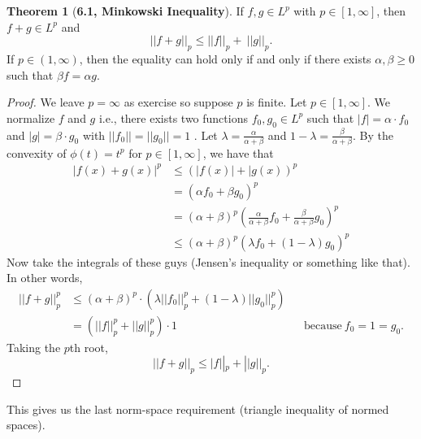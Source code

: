 \documentclass[12pt]{article}
\theoremstyle{definition}
\newtheorem*{thm}{Theorem}
\begin{document}
\begin{thm}[\textbf{6.1, Minkowski Inequality}]

        If \( f, g \in L^{p} \) with \( p \in [1, \infty] \), then \( f + g \in L^{p} \) and 
            \[
                ||f + g||_{p} \leq ||f||_{p} + \ ||g||_{p}.  
            \]
        If \( p \in (1, \infty) \), then the equality can hold only if and only if there exists \( \alpha, \beta \geq 0 \) such that \( \beta f = \alpha g \).

        \begin{proof}
            We leave \( p = \infty \) as exercise so suppose \( p \) is finite. Let \( p \in [1, \infty] \). We normalize \( f \) and \( g \) i.e., there exists two functions \( f_0, g_0 \in L^{p} \) such that \( |f| = \alpha \cdot f_0 \) and \( |g| = \beta \cdot g_0 \) with \( ||f_0|| = ||g_0|| = 1 \) . Let \( \displaystyle \lambda = \frac{\alpha}{\alpha + \beta } \) and \( \displaystyle 1 - \lambda = \frac{\beta}{\alpha + \beta} \). By the convexity of \( \phi(t) = t^p \) for \( p \in [1, \infty ] \), we have that 
                \begin{align*}
                    |f(x) + g(x)|^p &\leq \left( |f(x)| + |g(x)\right)^{p} \\
                    &= \left(\alpha f_0 + \beta g_0 \right)^{p} \\
                    &= (\alpha + \beta)^{p} \left( \frac{\alpha}{\alpha + \beta}  f_0 + \frac{\beta}{\alpha + \beta} g_0 \right)^{p} \\
                    &\leq (\alpha + \beta)^{p} \left( \lambda f_0 + (1 - \lambda) g_0 \right)^{p}
                \end{align*}
            Now take the integrals of these guys (Jensen's inequality or something like that). In other words,
                \begin{align*}
                    ||f+g||^{p}_{p} &\leq (\alpha + \beta)^{p} \cdot \left( \lambda ||f_0||^{p}_{p} + (1-\lambda) ||g_0||^{p}_{p} \right) \\
                    &=\left( ||f||^{p}_{p} + ||g||^{p}_{p} \right) \cdot 1 && \text{because} \ f_0 = 1 = g_0.
                \end{align*}
            Taking the \( p \)th root, 
                \[
                    ||f+g||_{p} \leq |f||_{p} + ||g||_{p}.
                \]
            
        \end{proof}
This gives us the last norm-space requirement (triangle inequality of normed spaces).
\end{thm}
\end{document}
